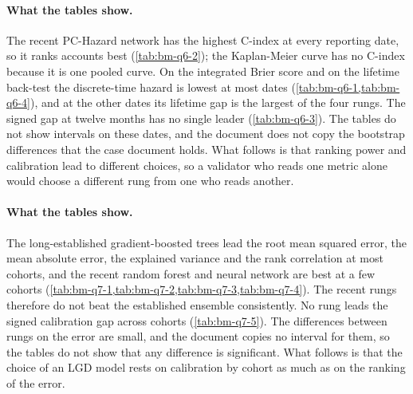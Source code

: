 

\paragraph{What the tables show.} The recent PC-Hazard network has the highest C-index at every reporting date, so it ranks accounts best (\cref{tab:bm-q6-2}); the Kaplan-Meier curve has no C-index because it is one pooled curve. On the integrated Brier score and on the lifetime back-test the discrete-time hazard is lowest at most dates (\cref{tab:bm-q6-1,tab:bm-q6-4}), and at the other dates its lifetime gap is the largest of the four rungs. The signed gap at twelve months has no single leader (\cref{tab:bm-q6-3}). The tables do not show intervals on these dates, and the document does not copy the bootstrap differences that the case document holds. What follows is that ranking power and calibration lead to different choices, so a validator who reads one metric alone would choose a different rung from one who reads another.



\paragraph{What the tables show.} The long-established gradient-boosted trees lead the root mean squared error, the mean absolute error, the explained variance and the rank correlation at most cohorts, and the recent random forest and neural network are best at a few cohorts (\cref{tab:bm-q7-1,tab:bm-q7-2,tab:bm-q7-3,tab:bm-q7-4}). The recent rungs therefore do not beat the established ensemble consistently. No rung leads the signed calibration gap across cohorts (\cref{tab:bm-q7-5}). The differences between rungs on the error are small, and the document copies no interval for them, so the tables do not show that any difference is significant. What follows is that the choice of an LGD model rests on calibration by cohort as much as on the ranking of the error.



